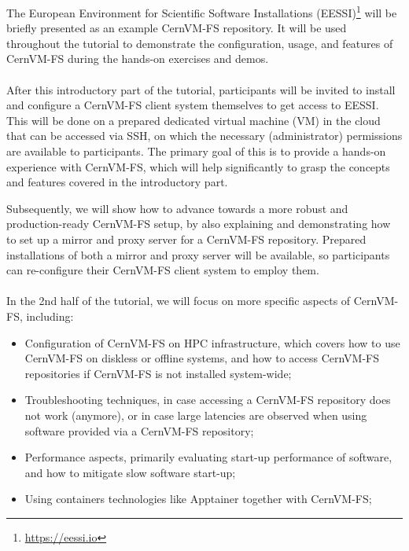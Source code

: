 The European Environment for Scientific Software Installations
(EESSI)\footnote{\href{https://eessi.io}{https://eessi.io}}
will be briefly presented as an example CernVM-FS repository.
It will be used throughout the tutorial to demonstrate the configuration, usage, and features of CernVM-FS
during the hands-on exercises and demos.

\paragraph{} 
After this introductory part of the tutorial, participants will be invited to install and configure a CernVM-FS
client system themselves
to get access to EESSI. This will be done on a prepared dedicated virtual machine (VM) in the cloud that can
be accessed via SSH,
on which the necessary (administrator) permissions are available to participants. The primary goal of this is to provide a hands-on experience
with CernVM-FS, which will help significantly to grasp the concepts and features covered in the introductory part.

Subsequently, we will show how to advance towards a more robust and production-ready CernVM-FS setup,
by also explaining and demonstrating how to set up a mirror and proxy server for a CernVM-FS repository.
Prepared installations of both a mirror and proxy server will be available, so participants can re-configure
their CernVM-FS client system to employ them.

\paragraph{}
In the 2nd half of the tutorial, we will focus on more specific aspects of CernVM-FS, including:
\begin{itemize}
\item Configuration of CernVM-FS on HPC infrastructure, which covers how to use CernVM-FS on diskless or offline systems,
      and how to access CernVM-FS repositories if CernVM-FS is not installed system-wide;
\item Troubleshooting techniques, in case accessing a CernVM-FS repository does not work (anymore), or in case
      large latencies are observed when using software provided via a CernVM-FS repository;
\item Performance aspects, primarily evaluating start-up performance of software, and how to mitigate slow software
      start-up;
\item Using containers technologies like Apptainer together with CernVM-FS;
\end{itemize}

